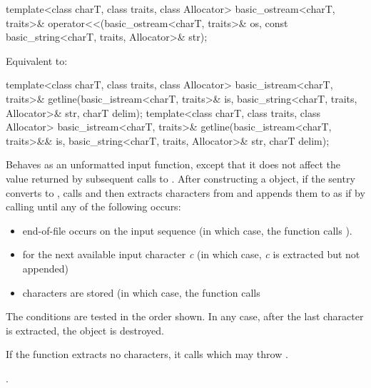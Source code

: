 %
\begin{itemdecl}
template<class charT, class traits, class Allocator>
  basic_ostream<charT, traits>&
    operator<<(basic_ostream<charT, traits>& os,
               const basic_string<charT, traits, Allocator>& str);
\end{itemdecl}

\begin{itemdescr}
\pnum
\effects
Equivalent to: 
\end{itemdescr}

%
\begin{itemdecl}
template<class charT, class traits, class Allocator>
  basic_istream<charT, traits>&
    getline(basic_istream<charT, traits>& is,
            basic_string<charT, traits, Allocator>& str,
            charT delim);
template<class charT, class traits, class Allocator>
  basic_istream<charT, traits>&
    getline(basic_istream<charT, traits>&& is,
            basic_string<charT, traits, Allocator>& str,
            charT delim);
\end{itemdecl}

\begin{itemdescr}
\pnum
\effects
Behaves as an unformatted input function,
except that it does not affect the value returned by subsequent calls to
.
After constructing a
object, if the sentry converts to , calls
and then extracts characters from  and appends them
to  as if by calling
until any of the following occurs:

\begin{itemize}
\item
end-of-file occurs on the input sequence
(in which case, the
function calls
).
\item
{}
for the next available input character
\textit{c}
(in which case,
\textit{c}
is extracted but not appended)
\item
{}
characters are stored
(in which case,
the function calls
\end{itemize}

\pnum
The conditions are tested in the order shown.
In any case,
after the last character is extracted, the
object is destroyed.

\pnum
If the function extracts no characters, it calls
which may throw
.

\pnum
\returns
{}.
\end{itemdescr}

